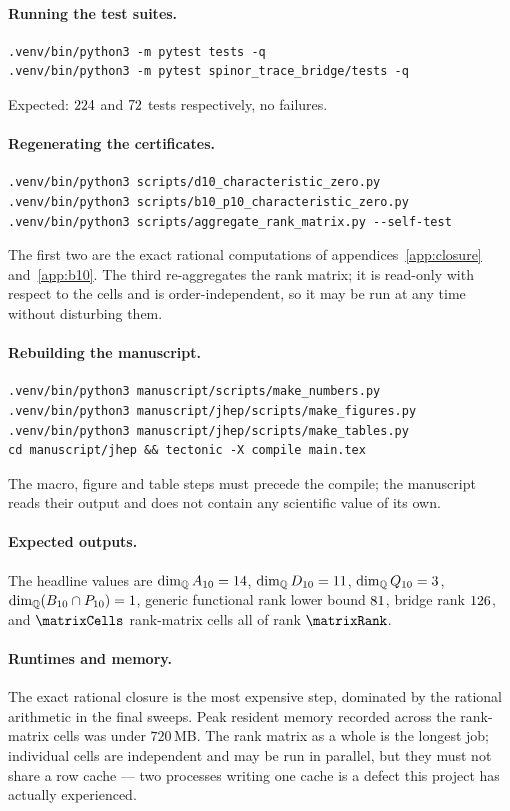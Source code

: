 \paragraph{Running the test suites.}
\begin{verbatim}
.venv/bin/python3 -m pytest tests -q
.venv/bin/python3 -m pytest spinor_trace_bridge/tests -q
\end{verbatim}
Expected: $224$ and $72$ tests respectively, no failures.

\paragraph{Regenerating the certificates.}
\begin{verbatim}
.venv/bin/python3 scripts/d10_characteristic_zero.py
.venv/bin/python3 scripts/b10_p10_characteristic_zero.py
.venv/bin/python3 scripts/aggregate_rank_matrix.py --self-test
\end{verbatim}
The first two are the exact rational computations of
appendices~\ref{app:closure} and~\ref{app:b10}. The third re-aggregates the rank
matrix; it is read-only with respect to the cells and is order-independent, so it
may be run at any time without disturbing them.

\paragraph{Rebuilding the manuscript.}
\begin{verbatim}
.venv/bin/python3 manuscript/scripts/make_numbers.py
.venv/bin/python3 manuscript/jhep/scripts/make_figures.py
.venv/bin/python3 manuscript/jhep/scripts/make_tables.py
cd manuscript/jhep && tectonic -X compile main.tex
\end{verbatim}
The macro, figure and table steps must precede the compile; the manuscript reads
their output and does not contain any scientific value of its own.

\paragraph{Expected outputs.}
The headline values are
$\dim_{\mathbb{Q}}A_{10} = 14$,
$\dim_{\mathbb{Q}}D_{10} = 11$,
$\dim_{\mathbb{Q}}Q_{10} = 3$,
$\dim_{\mathbb{Q}}(B_{10}\cap P_{10}) = 1$,
generic functional rank lower bound $81$,
bridge rank $126$, and $\matrixCells$ rank-matrix cells all of
rank $\matrixRank$.

\paragraph{Runtimes and memory.}
The exact rational closure is the most expensive step, dominated by the rational
arithmetic in the final sweeps. Peak resident memory recorded across the
rank-matrix cells was under $720$\,MB. The rank matrix as a whole is the longest
job; individual cells are independent and may be run in parallel, but they must
not share a row cache --- two processes writing one cache is a defect this
project has actually experienced.


